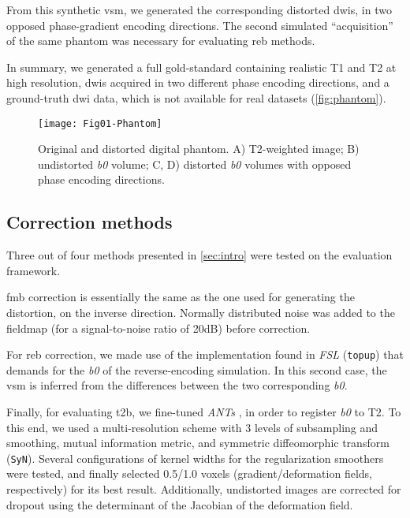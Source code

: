 From this synthetic \gls*{vsm},
we generated
the corresponding distorted \glspl*{dwi}, in two opposed
phase-gradient encoding directions. The second simulated
``acquisition'' of the same phantom was necessary 
for evaluating \gls*{reb} methods.

In summary, we generated 
a full gold-standard containing realistic T1 and T2
at high resolution, \glspl*{dwi} acquired in two
different phase encoding directions, and a ground-truth
\gls*{dwi} data, which is not available for real datasets
(\autoref{fig:phantom}).


\begin{figure}[thpb]
   \centering
   \texttt{[image: Fig01-Phantom]}
   \caption{Original and distorted digital phantom.
   A) T2-weighted image; B) undistorted \textit{b0} volume;
   C, D) distorted \textit{b0} volumes with opposed phase encoding 
   directions.}
   \label{fig:phantom}
\end{figure}

\subsection{Correction methods}
\label{sec:correction}
Three out of four methods presented in \autoref{sec:intro}
were tested on the evaluation framework. 

\Gls*{fmb} correction
is essentially the same as the one used for generating the 
distortion, on the inverse direction. Normally distributed 
noise was added to the fieldmap (for a signal-to-noise 
ratio of 20dB) before correction.

For \Gls*{reb} correction, we made use of the implementation found 
in \emph{FSL} (\texttt{topup})
that demands for the \textit{b0} of the reverse-encoding simulation.
In this second case, the \gls*{vsm} is inferred from the differences
between the two corresponding \textit{b0}.

Finally, for evaluating \Gls*{t2b},
we fine-tuned \emph{ANTs} \cite{avants_ants:_2013},
in order to register \textit{b0} to T2. To this end, we used a
multi-resolution scheme with 3 levels of subsampling and smoothing,
mutual information metric, and symmetric diffeomorphic transform 
(\texttt{SyN}). Several configurations of kernel widths for the 
regularization smoothers were tested, and finally selected 
0.5/1.0 voxels (gradient/deformation fields, respectively) 
for its best result. Additionally, undistorted images are 
corrected for dropout using the determinant
of the Jacobian of the deformation field.

